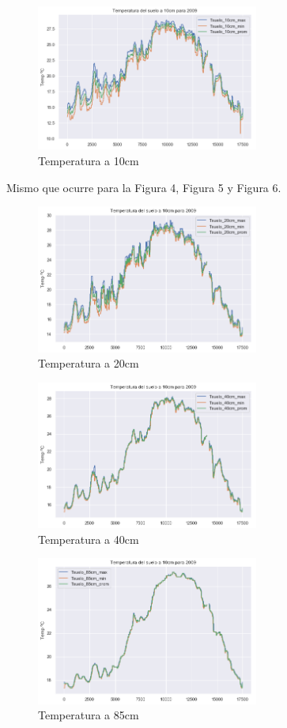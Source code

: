 \documentclass[11pt, spanish]{report}
\begin{document}
\begin{figure}[ht]
\caption{Temperatura a 10cm}
\centering
\includegraphics[width=0.65\textwidth]{figura3.png}
\end{figure}
Mismo que ocurre para la Figura 4, Figura 5 y Figura 6.
\begin{figure}[ht]
\caption{Temperatura a 20cm}
\centering
\includegraphics[width=0.65\textwidth]{figura4.png}
\end{figure}\begin{figure}[ht]
\caption{Temperatura a 40cm}
\centering
\includegraphics[width=0.65\textwidth]{figura5.png}
\end{figure}\begin{figure}[ht]
\caption{Temperatura a 85cm}
\centering
\includegraphics[width=0.65\textwidth]{figura6.png}
\end{figure}
\end{document}
